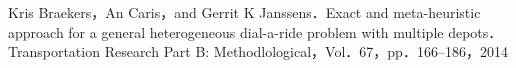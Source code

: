 \documentclass[a4j,11pt,twocolumn]{jsarticle}
\begin{document}
\begin{thebibliography}{99}
   Kris Braekers，An Caris，and Gerrit K Janssens．Exact and meta-heuristic approach for a general heterogeneous dial-a-ride problem with multiple depots．Transportation Research Part B: Methodlological，Vol．67，pp．166--186，2014
\end{thebibliography}
\end{document}

